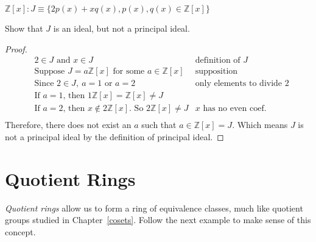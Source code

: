 \begin{example}
${\mathbb Z}[x]: J\equiv \{2p(x)+xq(x),p(x),q(x)\in {\mathbb Z}[x]\}$

Show that $J$ is an ideal, but not a principal ideal.\\

\begin{proof}
\begin{align*}
&\text{$2\in J$ and $x\in J$} &\text{definition of $J$}\\
&\text{Suppose $J=a{\mathbb Z}[x]$ for some $a\in {\mathbb Z}[x]$} & \text{supposition}\\
&\text{Since $2\in J,~a=1$ or $a=2$} & \text{only elements to divide 2}\\
&\text{If $a=1$, then $1{\mathbb Z}[x]={\mathbb Z}[x]\neq J$} &\\
&\text{If $a=2$, then $x\notin 2{\mathbb Z}[x]$. So $2{\mathbb Z}[x]\neq J$} & \text{$x$ has no even coef.}\\
\end{align*}
Therefore, there does not exist an $a$ such that $a\in {\mathbb Z}[x]=J$. Which means $J$ is not a principal ideal by the definition of principal ideal.
\end{proof}
\end{example}

\section{Quotient Rings}
\label{sec:QuotientRings}

\emph{Quotient rings} allow us to form a ring of equivalence classes, much like quotient groups studied in Chapter~\ref{cosets}.  Follow the next example to make sense of this concept.

